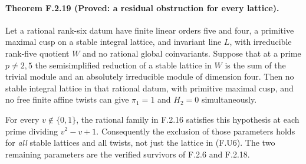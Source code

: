 \paragraph{Theorem F.2.19 (Proved: a residual obstruction for every lattice).}
Let a rational rank-six datum have finite linear orders five
and four, a primitive maximal cusp on a stable integral lattice,
and invariant line $L$, with irreducible rank-five quotient $W$
and no rational global coinvariants.  Suppose that at a prime
$p\ne2,5$ the semisimplified reduction of a stable lattice in
$W$ is the sum of the trivial module and an absolutely
irreducible module of dimension four.  Then no stable integral
lattice in that rational datum, with primitive maximal cusp,
and no free finite affine twists can give
$\pi_1=1$ and $H_2=0$ simultaneously.

For every $v\notin\{0,1\}$, the rational family in F.2.16
satisfies this hypothesis at each prime dividing
$v^2-v+1$.  Consequently the exclusion of those parameters
holds for \emph{all} stable lattices and all twists, not just
the lattice in (F.U6).  The two remaining parameters are the
verified survivors of F.2.6 and F.2.18.

